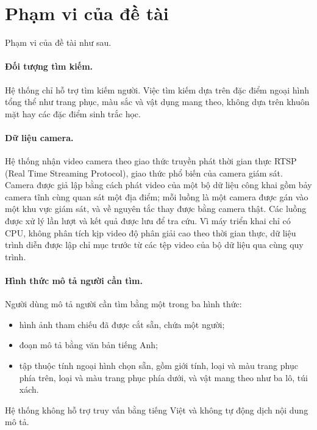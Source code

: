 \section{Phạm vi của đề tài}
\label{sec:1.3}

Phạm vi của đề tài như sau.

\paragraph{Đối tượng tìm kiếm.} Hệ thống chỉ hỗ trợ tìm kiếm người. Việc tìm kiếm dựa trên đặc điểm ngoại hình tổng thể như trang phục, màu sắc và vật dụng mang theo, không dựa trên khuôn mặt hay các đặc điểm sinh trắc học.

\paragraph{Dữ liệu camera.} Hệ thống nhận video camera theo giao thức truyền phát thời gian thực RTSP (Real Time Streaming Protocol), giao thức phổ biến của camera giám sát. Camera được giả lập bằng cách phát video của một bộ dữ liệu công khai gồm bảy camera tĩnh cùng quan sát một địa điểm; mỗi luồng là một camera được gán vào một khu vực giám sát, và về nguyên tắc thay được bằng camera thật. Các luồng được xử lý lần lượt và kết quả được lưu để tra cứu. Vì máy triển khai chỉ có CPU, không phân tích kịp video độ phân giải cao theo thời gian thực, dữ liệu trình diễn được lập chỉ mục trước từ các tệp video của bộ dữ liệu qua cùng quy trình.

\paragraph{Hình thức mô tả người cần tìm.} Người dùng mô tả người cần tìm bằng một trong ba hình thức:
\begin{itemize}
    \item hình ảnh tham chiếu đã được cắt sẵn, chứa một người;
    \item đoạn mô tả bằng văn bản tiếng Anh;
    \item tập thuộc tính ngoại hình chọn sẵn, gồm giới tính, loại và màu trang phục phía trên, loại và màu trang phục phía dưới, và vật mang theo như ba lô, túi xách.
\end{itemize}
Hệ thống không hỗ trợ truy vấn bằng tiếng Việt và không tự động dịch nội dung mô tả.

